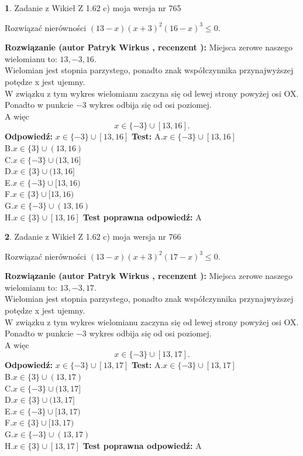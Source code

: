 \documentclass[12pt, a4paper]{article}
\theoremstyle{definition} %
\newtheorem{zad}{}
\newcommand{\zadStart}[1]{\begin{zad}#1\newline}
\newcommand{\zadStop}{\end{zad}}
\newcommand{\rozwStart}[2]{\noindent \textbf{Rozwiązanie (autor #1 , recenzent #2): }\newline}
\newcommand{\rozwStop}{\newline}
\newcommand{\odpStart}{\noindent \textbf{Odpowiedź:}\newline}
\newcommand{\odpStop}{\newline}
\newcommand{\testStart}{\noindent \textbf{Test:}\newline}
\newcommand{\testStop}{\newline}
\newcommand{\kluczStart}{\noindent \textbf{Test poprawna odpowiedź:}\newline}
\newcommand{\kluczStop}{\newline}
\begin{document}
\zadStart{Zadanie z Wikieł Z 1.62 c) moja wersja nr 765}

Rozwiązać nierówności $(13-x)(x+3)^{2}(16-x)^{3}\le0$.
\zadStop
\rozwStart{Patryk Wirkus}{}
Miejsca zerowe naszego wielomianu to: $13, -3, 16$.\\
Wielomian jest stopnia parzystego, ponadto znak współczynnika przy\linebreak najwyższej potędze x jest ujemny.\\ W związku z tym wykres wielomianu zaczyna się od lewej strony powyżej osi OX.\\
Ponadto w punkcie $-3$ wykres odbija się od osi poziomej.\\
A więc $$x \in \{-3\} \cup [13,16].$$
\rozwStop
\odpStart
$x \in \{-3\} \cup [13,16]$
\odpStop
\testStart
A.$x \in \{-3\} \cup [13,16]$\\
B.$x \in \{3\} \cup (13,16)$\\
C.$x \in \{-3\} \cup (13,16]$\\
D.$x \in \{3\} \cup (13,16]$\\
E.$x \in \{-3\} \cup [13,16)$\\
F.$x \in \{3\} \cup [13,16)$\\
G.$x \in \{-3\} \cup (13,16)$\\
H.$x \in \{3\} \cup [13,16]$
\testStop
\kluczStart
A
\kluczStop



\zadStart{Zadanie z Wikieł Z 1.62 c) moja wersja nr 766}

Rozwiązać nierówności $(13-x)(x+3)^{2}(17-x)^{3}\le0$.
\zadStop
\rozwStart{Patryk Wirkus}{}
Miejsca zerowe naszego wielomianu to: $13, -3, 17$.\\
Wielomian jest stopnia parzystego, ponadto znak współczynnika przy\linebreak najwyższej potędze x jest ujemny.\\ W związku z tym wykres wielomianu zaczyna się od lewej strony powyżej osi OX.\\
Ponadto w punkcie $-3$ wykres odbija się od osi poziomej.\\
A więc $$x \in \{-3\} \cup [13,17].$$
\rozwStop
\odpStart
$x \in \{-3\} \cup [13,17]$
\odpStop
\testStart
A.$x \in \{-3\} \cup [13,17]$\\
B.$x \in \{3\} \cup (13,17)$\\
C.$x \in \{-3\} \cup (13,17]$\\
D.$x \in \{3\} \cup (13,17]$\\
E.$x \in \{-3\} \cup [13,17)$\\
F.$x \in \{3\} \cup [13,17)$\\
G.$x \in \{-3\} \cup (13,17)$\\
H.$x \in \{3\} \cup [13,17]$
\testStop
\kluczStart
A
\kluczStop
\end{document}
